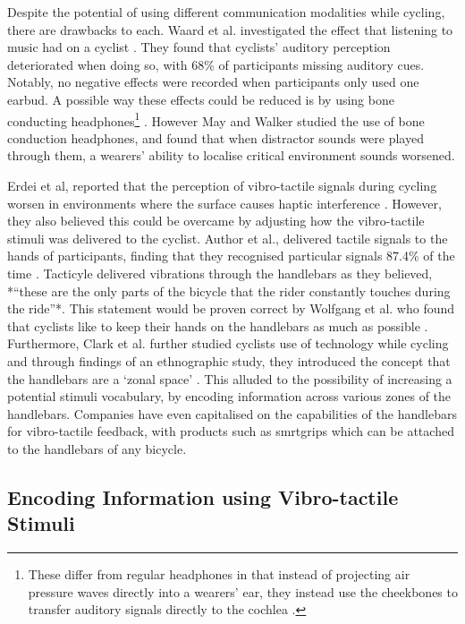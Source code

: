 \documentclass{interim}
\begin{document}
Despite the potential of using different communication modalities while cycling, there are drawbacks to each. Waard et al. investigated the effect that listening to music had on a cyclist \cite{DEWAARD2011626}. They found that cyclists' auditory perception deteriorated when doing so, with 68\% of participants missing auditory cues. Notably, no negative effects were recorded when participants only used one earbud.
A possible way these effects could be reduced is by using bone conducting headphones\footnote{These differ from regular headphones in that instead of projecting air pressure waves directly into a wearers' ear, they instead use the cheekbones to transfer auditory signals directly to the cochlea \cite{littler1952hearing}.} \cite{wolfe2016distracted}. However May and Walker \cite{may2017effects} studied the use of bone conduction headphones, and found that when distractor sounds were played through them, a wearers' ability to localise critical environment sounds worsened.

Erdei et al, reported that the perception of vibro-tactile signals during cycling worsen in environments where the surface causes haptic interference \cite{erdei2020comparing, doi:10.1080/15389588.2021.1985113}. However, they also believed this could be overcame by adjusting how the vibro-tactile stimuli was delivered to the cyclist. Author et al., delivered tactile signals to the hands of participants, finding that they recognised particular signals 87.4\% of the time \cite{10.1145/1979742.1979760}. Tacticyle \cite{10.1145/2371574.2371631} delivered vibrations through the handlebars as they believed, *“these are the only parts of the bicycle that the rider constantly touches during the ride”*. This statement would be proven correct by Wolfgang et al. who found that cyclists like to keep their hands on the handlebars as much as possible \cite{10.1145/3152832.3152871}. Furthermore, Clark et al. further studied cyclists use of technology while cycling and through findings of an ethnographic study, they introduced the concept that the handlebars are a ‘zonal space’ \cite{10.1145/3544548.3580971}. This alluded to the possibility of increasing a potential stimuli vocabulary, by encoding information across various zones of the handlebars. Companies have even capitalised on the capabilities of the handlebars for vibro-tactile feedback, with products such as smrtgrips \cite{smartgrips} which can be attached to the handlebars of any bicycle.


\subsection{Encoding Information using Vibro-tactile Stimuli}
\end{document}
